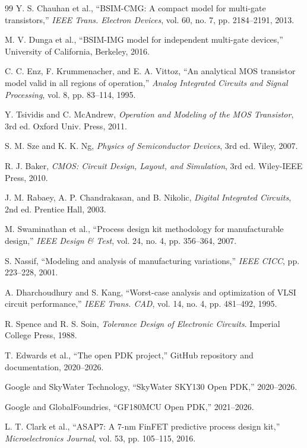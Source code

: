 \documentclass[12pt,a4paper,oneside]{report}
\begin{document}
\begin{thebibliography}{99}
Y. S. Chauhan et al., ``BSIM-CMG: A compact model for multi-gate transistors,'' \emph{IEEE Trans. Electron Devices}, vol. 60, no. 7, pp. 2184--2191, 2013.

M. V. Dunga et al., ``BSIM-IMG model for independent multi-gate devices,'' University of California, Berkeley, 2016.

C. C. Enz, F. Krummenacher, and E. A. Vittoz, ``An analytical MOS transistor model valid in all regions of operation,'' \emph{Analog Integrated Circuits and Signal Processing}, vol. 8, pp. 83--114, 1995.

Y. Tsividis and C. McAndrew, \emph{Operation and Modeling of the MOS Transistor}, 3rd ed. Oxford Univ. Press, 2011.

S. M. Sze and K. K. Ng, \emph{Physics of Semiconductor Devices}, 3rd ed. Wiley, 2007.

R. J. Baker, \emph{CMOS: Circuit Design, Layout, and Simulation}, 3rd ed. Wiley-IEEE Press, 2010.

J. M. Rabaey, A. P. Chandrakasan, and B. Nikolic, \emph{Digital Integrated Circuits}, 2nd ed. Prentice Hall, 2003.

M. Swaminathan et al., ``Process design kit methodology for manufacturable design,'' \emph{IEEE Design \& Test}, vol. 24, no. 4, pp. 356--364, 2007.

S. Nassif, ``Modeling and analysis of manufacturing variations,'' \emph{IEEE CICC}, pp. 223--228, 2001.

A. Dharchoudhury and S. Kang, ``Worst-case analysis and optimization of VLSI circuit performance,'' \emph{IEEE Trans. CAD}, vol. 14, no. 4, pp. 481--492, 1995.

R. Spence and R. S. Soin, \emph{Tolerance Design of Electronic Circuits}. Imperial College Press, 1988.

T. Edwards et al., ``The open PDK project,'' GitHub repository and documentation, 2020--2026.

Google and SkyWater Technology, ``SkyWater SKY130 Open PDK,'' 2020--2026.

Google and GlobalFoundries, ``GF180MCU Open PDK,'' 2021--2026.

L. T. Clark et al., ``ASAP7: A 7-nm FinFET predictive process design kit,'' \emph{Microelectronics Journal}, vol. 53, pp. 105--115, 2016.


\end{thebibliography}
\end{document}
